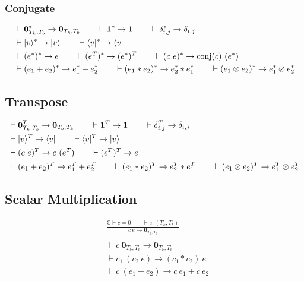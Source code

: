 \subsubsection*{Conjugate}
\begin{align*}
  & \vdash \textbf{0}_{T_k, T_b}^* \to \textbf{0}_{T_k, T_b} 
  \qquad \vdash \mathbf{1}^* \to \mathbf{1}
  \qquad \vdash \delta_{i,j}^* \to \delta_{i,j}\\
  & \vdash |v\rangle^* \to |v\rangle 
  \qquad \vdash \langle v|^* \to \langle v| \\
  & \vdash (e^*)^*\to e
  \qquad \vdash (e^T)^* \to (e^*)^T
  \qquad \vdash (c\ e)^* \to \textrm{conj}(c)\ (e^*)\\
  & \vdash (e_1 + e_2)^* \to e_1^* + e_2^* \qquad \vdash (e_1 * e_2)^* \to e_2^* * e_1^* \qquad \vdash (e_1 \otimes e_2)^* \to e_1^* \otimes e_2^*
\end{align*}

\subsection*{Transpose}
\begin{align*}
  & \vdash \textbf{0}_{T_k, T_b}^T \to \textbf{0}_{T_b, T_k} 
  \qquad \vdash \mathbf{1}^T \to \mathbf{1}
  \qquad \vdash \delta_{i,j}^T \to \delta_{i,j} \\
  & \vdash |v\rangle^T \to \langle v| 
  \qquad \vdash \langle v|^T \to |v\rangle \\
  & \vdash (c\ e)^T \to c\ (e^T)
  \qquad \vdash (e^T)^T \to e\\
  & \vdash (e_1 + e_2)^T \to e_1^T + e_2^T \qquad \vdash (e_1 * e_2)^T \to e_2^T * e_1^T \qquad \vdash (e_1 \otimes e_2)^T \to e_1^T \otimes e_2^T
\end{align*}

\subsection*{Scalar Multiplication}
\begin{align*}
  & \frac{\mathbb{C} \vdash c = 0 \qquad \vdash e : (T_k, T_b)}{c\ e \to \textbf{0}_{T_k, T_b}}\\
  &\ \\
  &\vdash c\ \mathbf{0}_{T_k, T_b} \to \mathbf{0}_{T_k, T_b} \\
  &\vdash c_1\ (c_2\ e) \to (c_1 * c_2)\ e \\
  &\vdash c\ (e_1 + e_2) \to c\ e_1 + c\ e_2
\end{align*}


